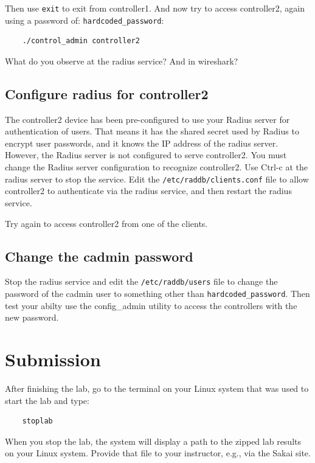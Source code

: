 Then use {\tt exit} to exit from controller1.  And now try to access
controller2, again using a password of: {\tt hardcoded\_password}:
\begin{verbatim}
    ./control_admin controller2
\end{verbatim}
\noindent What do you observe at the radius service?  And in wireshark?

\subsection{Configure radius for controller2}
The controller2 device has been pre-configured to use your Radius server for 
authentication of users.  That means it has the shared secret used by Radius
to encrypt user passwords, and it knows the IP address of the radius server.
However, the Radius server is not configured to serve controller2.  You must
change the Radius server configuration to recognize controller2.
Use Ctrl-c at the radius server to stop the service.
Edit the {\tt /etc/raddb/clients.conf} file to allow controller2 to authenticate
via the radius service, and then restart the radius service.

Try again to access controller2 from one of the clients.

\subsection{Change the cadmin password}
Stop the radius service and edit the {\tt /etc/raddb/users} file to change the 
password of the cadmin user to something other than {\tt hardcoded\_password}.  Then test your abilty
use the config\_admin  utility to access the controllers with the new password.

\section{Submission}
After finishing the lab, go to the terminal on your Linux system that was used to start the lab and type:
\begin{verbatim}
    stoplab 
\end{verbatim}
When you stop the lab, the system will display a path to the zipped lab results on your Linux system.  Provide that file to 
your instructor, e.g., via the Sakai site.


